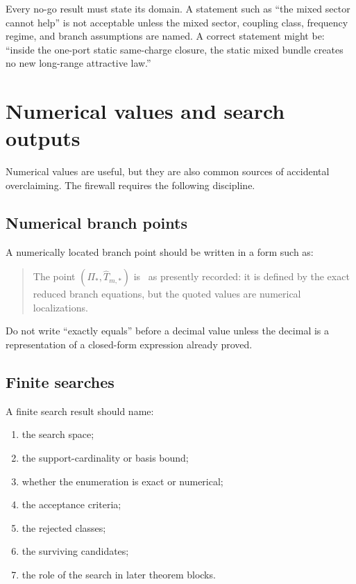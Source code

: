 Every no-go result must state its domain.  A statement such as ``the mixed sector cannot help'' is not acceptable unless the mixed sector, coupling class, frequency regime, and branch assumptions are named.  A correct statement might be: ``inside the one-port static same-charge closure, the static mixed bundle creates no new long-range attractive law.''

\section{Numerical values and search outputs}
\label{sec:numerical-values-search-outputs}

Numerical values are useful, but they are also common sources of accidental overclaiming.  The firewall requires the following discipline.

\subsection{Numerical branch points}
\label{subsec:numerical-branch-points}

A numerically located branch point should be written in a form such as:
\begin{quote}
The point \((\Pi_*,\widehat T_{m,*})\) is \StatusNumerical\ as presently recorded: it is defined by the exact reduced branch equations, but the quoted values are numerical localizations.
\end{quote}

Do not write ``exactly equals'' before a decimal value unless the decimal is a representation of a closed-form expression already proved.

\subsection{Finite searches}
\label{subsec:finite-searches}

A finite search result should name:
\begin{enumerate}[leftmargin=2.2em]
  \item the search space;
  \item the support-cardinality or basis bound;
  \item whether the enumeration is exact or numerical;
  \item the acceptance criteria;
  \item the rejected classes;
  \item the surviving candidates;
  \item the role of the search in later theorem blocks.
\end{enumerate}

